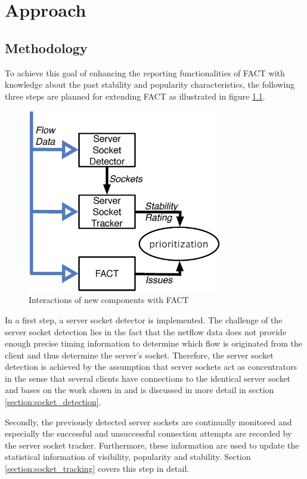 
\chapter{Approach\label{chapter:approach}}

\section{Methodology\label{section:methodology}}

To achieve this goal of enhancing the reporting functionalities of FACT
with knowledge about the past stability and popularity characteristics,
the following three steps are planned for extending FACT 
as illustrated in figure \ref{fig:FACT}.

\begin{figure}[ht]
\centering \includegraphics[width=8.5cm]{images/Approach_blockdiagram.eps}
\caption{Interactions of new components with FACT}
\label{fig:FACT}
\end{figure}

In a first step, a server socket detector is implemented. The
challenge of the server socket detection lies in the fact that the
netflow data does not provide enough precise timing information to
determine which flow is originated from the client and thus determine
the server's socket. Therefore, the server socket detection is
achieved by the assumption that server sockets act as concentrators
in the sense that several clients have connections to the identical
server socket and bases on the work shown in \cite{Schatzmann:Dissection,Schatzmann:Mining,Schatzmann:Tracing} and is discussed in more detail in section \ref{section:socket_detection}.

Secondly, the previously detected server sockets are continually
monitored and especially the successful and unsuccessful connection
attempts are recorded by the server socket tracker. 
Furthermore, these information are used to update the statistical 
information of visibility, popularity and stability. Section \ref{section:socket_tracking} covers this step in detail.

